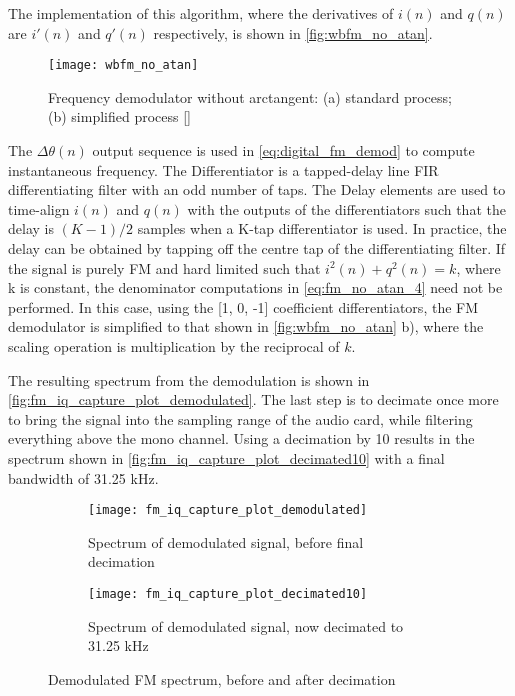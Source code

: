 The implementation of this algorithm, where the derivatives of $i(n)$ and $q(n)$ are $i'(n)$ and $q'(n)$ respectively, is shown in \autoref{fig:wbfm_no_atan}.

\begin{figure}[H]
  \centering
  \texttt{[image: wbfm\_no\_atan]}
  \caption{Frequency demodulator without arctangent: (a) standard process; (b) simplified process [\citeauthor{wbfm_alt_receiver}]}
  \label{fig:wbfm_no_atan}
\end{figure}

The $\Delta\theta(n)$ output sequence is used in \eqref{eq:digital_fm_demod} to compute instantaneous frequency. The Differentiator is a tapped-delay line FIR differentiating filter with an odd number of taps. The Delay elements are used to time-align $i(n)$ and $q(n)$ with the outputs of the differentiators such that the delay is $(K-1)/2$ samples when a K-tap differentiator is used. In practice, the delay can be obtained by tapping off the centre tap of the differentiating filter. If the signal  is purely FM and hard limited such that $i^2(n)+q^2(n)=k$, where k is constant, the denominator computations in \eqref{eq:fm_no_atan_4} need not be performed. In this case, using the [1, 0, -1] coefficient differentiators, the FM demodulator is simplified to that shown in \autoref{fig:wbfm_no_atan} b), where the scaling operation is multiplication by the reciprocal of $k$.

The resulting spectrum from the demodulation is shown in \autoref{fig:fm_iq_capture_plot_demodulated}. The last step is to decimate once more to bring the signal into the sampling range of the audio card, while filtering everything above the mono channel. Using a decimation by 10 results in the spectrum shown in \autoref{fig:fm_iq_capture_plot_decimated10} with a final bandwidth of 31.25 kHz.

\begin{figure} [H]
  \begin{subfigure}{.5\textwidth}
    \centering
    \texttt{[image: fm\_iq\_capture\_plot\_demodulated]}
    \caption{Spectrum of demodulated signal, before final decimation}
    \label{fig:fm_iq_capture_plot_demodulated}
  \end{subfigure}%
  \begin{subfigure}{.5\textwidth}
    \centering
    \texttt{[image: fm\_iq\_capture\_plot\_decimated10]}
    \caption{Spectrum of demodulated signal, now decimated to 31.25 kHz}
    \label{fig:fm_iq_capture_plot_decimated10}
  \end{subfigure}
  \caption{Demodulated FM spectrum, before and after decimation}
\end{figure}

